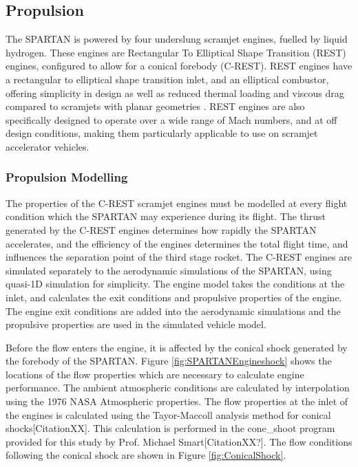 		


\subsection{Propulsion}


The SPARTAN is powered by four underslung scramjet engines, fuelled by liquid hydrogen. These engines are Rectangular To Elliptical Shape Transition (REST) engines, configured to allow for a conical forebody (C-REST). REST engines have a rectangular to elliptical shape transition inlet, and an elliptical combustor, offering simplicity in design as well as reduced thermal loading and viscous drag compared to scramjets with planar geometries \cite{Suraweera2009}.  REST engines are also specifically designed to operate over a wide range of Mach numbers, and at off design conditions, making them particularly applicable to use on scramjet accelerator vehicles. 


\subsubsection{Propulsion Modelling}\label{sec:Propulsion}

The properties of the C-REST scramjet engines must be modelled at every flight condition which the SPARTAN may experience during its flight. The thrust generated by the C-REST engines determines how rapidly the SPARTAN accelerates, and the efficiency of the engines determines the total flight time, and influences the separation point of the third stage rocket. The C-REST engines are simulated separately to the aerodynamic simulations of the SPARTAN, using quasi-1D simulation for simplicity. The engine model takes the conditions at the inlet, and calculates the exit conditions and propulsive properties of the engine. The engine exit conditions are added into the aerodynamic simulations and the propulsive properties are used in the simulated vehicle model.

Before the flow enters the engine, it is affected by the conical shock generated by the forebody of the SPARTAN.
Figure \ref{fig:SPARTANEngineshock} shows the locations of the flow properties which are necessary to calculate engine performance. The ambient atmospheric conditions are calculated by interpolation using the 1976 NASA Atmospheric properties\cite{Administration1976}.
The flow properties at the inlet of the engines is calculated using the Tayor-Maccoll analysis method for conical shocks[CitationXX]. This calculation is performed in the cone\_shoot program provided for this study by Prof. Michael Smart[CitationXX?]. The flow conditions following the conical shock are shown in Figure \ref{fig:ConicalShock}.  

